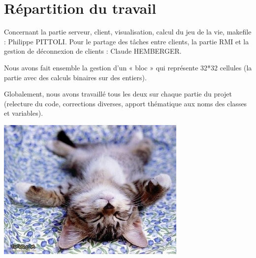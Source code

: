 \documentclass[twoside]{article}
\begin{document}
\section{Répartition du travail}
Concernant la partie serveur, client, visualisation, calcul du jeu de la vie, makefile : Philippe PITTOLI.
Pour le partage des tâches entre clients, la partie RMI et la gestion de déconnexion de clients : Claude HEMBERGER.

Nous avons fait ensemble la gestion d'un « bloc » qui représente 32*32 cellules (la partie avec des calculs binaires sur des entiers).

Globalement, nous avons travaillé tous les deux sur chaque partie du projet (relecture du code, corrections diverses, apport thématique aux noms des classes et variables).

\begin{center} 
	\includegraphics[scale=0.5]{img/chaton.jpg}
\end{center}
\end{document}
